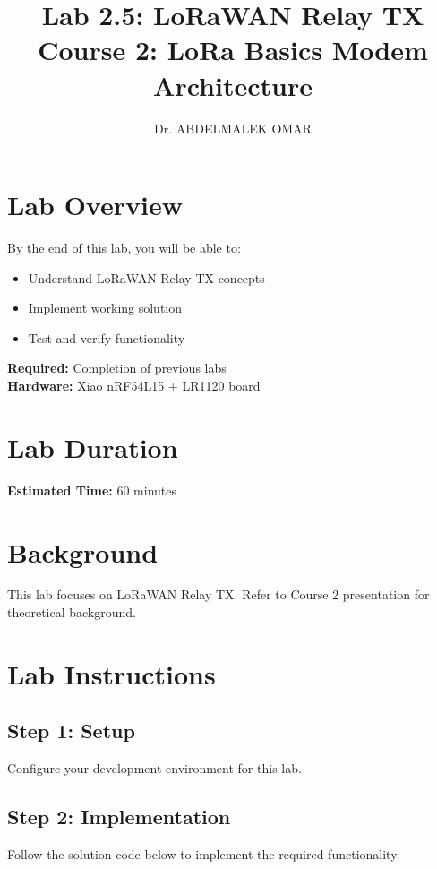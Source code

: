 \documentclass[11pt,a4paper]{article}
\title{\textbf{Lab 2.5: LoRaWAN Relay TX}\\
\large Course 2: LoRa Basics Modem Architecture}
\author{Dr. ABDELMALEK OMAR}
\date{}
\begin{document}
\maketitle
\thispagestyle{fancy}

\section{Lab Overview}

\begin{objectivebox}
By the end of this lab, you will be able to:
\begin{itemize}
    \item Understand LoRaWAN Relay TX concepts
    \item Implement working solution
    \item Test and verify functionality
\end{itemize}
\end{objectivebox}

\begin{prereqbox}
\textbf{Required:} Completion of previous labs\\
\textbf{Hardware:} Xiao nRF54L15 + LR1120 board
\end{prereqbox}

\section{Lab Duration}
\textbf{Estimated Time:} 60 minutes

\section{Background}

This lab focuses on LoRaWAN Relay TX. Refer to Course 2 presentation for theoretical background.

\section{Lab Instructions}

\subsection{Step 1: Setup}
Configure your development environment for this lab.

\subsection{Step 2: Implementation}
Follow the solution code below to implement the required functionality.
\end{document}
